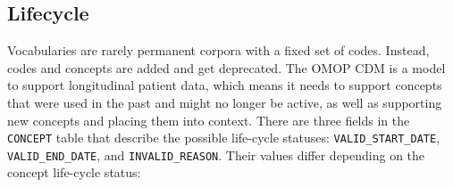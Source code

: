 \documentclass[
  letterpaper,
  paper=7in:10in,
  pagesize=pdftex,
  headinclude=on,
  footinclude=on,
  12pt]{scrbook}
\begin{document}
\subsection{Lifecycle}\label{lifecycle}

Vocabularies are rarely permanent corpora with a fixed set of codes.
Instead, codes and concepts are added and get deprecated. The OMOP CDM
is a model to support longitudinal patient data, which means it needs to
support concepts that were used in the past and might no longer be
active, as well as supporting new concepts and placing them into
context. There are three fields in the \texttt{CONCEPT} table that
describe the possible life-cycle statuses: \texttt{VALID\_START\_DATE},
\texttt{VALID\_END\_DATE}, and \texttt{INVALID\_REASON}. Their values
differ depending on the concept life-cycle status:
\end{document}
